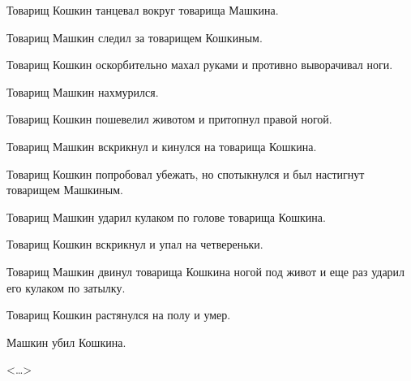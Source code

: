 Товарищ Кошкин танцевал вокруг товарища Машкина.

Товарищ Машкин следил за товарищем Кошкиным.

Товарищ Кошкин оскорбительно махал руками и противно выворачивал ноги.

Товарищ Машкин нахмурился.

Товарищ Кошкин пошевелил животом и притопнул правой ногой.

Товарищ Машкин вскрикнул и кинулся на товарища Кошкина.

Товарищ Кошкин попробовал убежать, но спотыкнулся и был настигнут товарищем Машкиным.

Товарищ Машкин ударил кулаком по голове товарища Кошкина.

Товарищ Кошкин вскрикнул и упал на четвереньки.

Товарищ Машкин двинул товарища Кошкина ногой под живот и еще раз ударил его кулаком по затылку.

Товарищ Кошкин растянулся на полу и умер.

\centerline{Машкин убил Кошкина.}

\begin{flushright} <\dots> \end{flushright}
